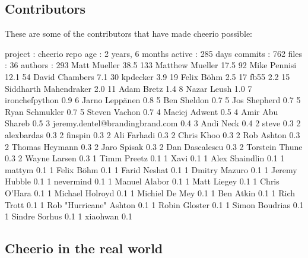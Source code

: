 \subsection*{Contributors}

These are some of the contributors that have made cheerio possible\+:


\begin{DoxyCode}
project  : cheerio
 repo age : 2 years, 6 months
 active   : 285 days
 commits  : 762
 files    : 36
 authors  :
   293  Matt Mueller            38.5%
   133  Matthew Mueller         17.5%
    92  Mike Pennisi            12.1%
    54  David Chambers          7.1%
    30  kpdecker                3.9%
    19  Felix Böhm             2.5%
    17  fb55                    2.2%
    15  Siddharth Mahendraker   2.0%
    11  Adam Bretz              1.4%
     8  Nazar Leush             1.0%
     7  ironchefpython          0.9%
     6  Jarno Leppänen         0.8%
     5  Ben Sheldon             0.7%
     5  Jos Shepherd            0.7%
     5  Ryan Schmukler          0.7%
     5  Steven Vachon           0.7%
     4  Maciej Adwent           0.5%
     4  Amir Abu Shareb         0.5%
     3  jeremy.dentel@brandingbrand.com 0.4%
     3  Andi Neck               0.4%
     2  steve                   0.3%
     2  alexbardas              0.3%
     2  finspin                 0.3%
     2  Ali Farhadi             0.3%
     2  Chris Khoo              0.3%
     2  Rob Ashton              0.3%
     2  Thomas Heymann          0.3%
     2  Jaro Spisak             0.3%
     2  Dan Dascalescu          0.3%
     2  Torstein Thune          0.3%
     2  Wayne Larsen            0.3%
     1  Timm Preetz             0.1%
     1  Xavi                    0.1%
     1  Alex Shaindlin          0.1%
     1  mattym                  0.1%
     1  Felix Böhm            0.1%
     1  Farid Neshat            0.1%
     1  Dmitry Mazuro           0.1%
     1  Jeremy Hubble           0.1%
     1  nevermind               0.1%
     1  Manuel Alabor           0.1%
     1  Matt Liegey             0.1%
     1  Chris O'Hara            0.1%
     1  Michael Holroyd         0.1%
     1  Michiel De Mey          0.1%
     1  Ben Atkin               0.1%
     1  Rich Trott              0.1%
     1  Rob "Hurricane" Ashton  0.1%
     1  Robin Gloster           0.1%
     1  Simon Boudrias          0.1%
     1  Sindre Sorhus           0.1%
     1  xiaohwan                0.1%
\end{DoxyCode}


\subsection*{Cheerio in the real world}

